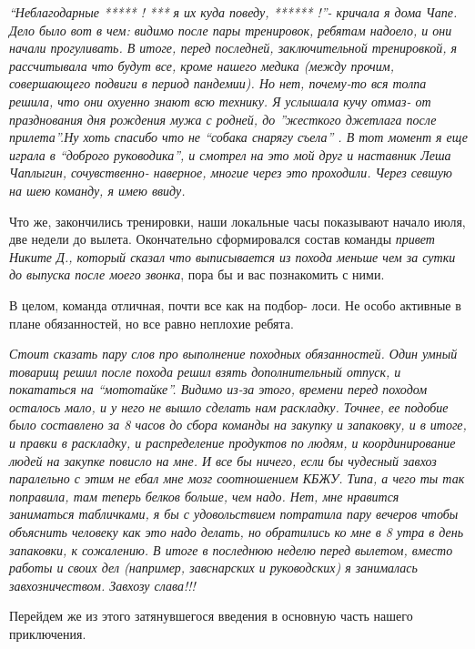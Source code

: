 \documentclass[]{article}
\begin{document}
\textit{“Неблагодарные ***** ! *** я их куда поведу, ****** !”- кричала я дома Чапе. Дело было вот в чем: видимо после пары тренировок, ребятам надоело, и они начали прогуливать. В итоге, перед последней, заключительной тренировкой, я рассчитывала что будут все, кроме нашего медика (между прочим, совершающего подвиги в период пандемии). Но нет, почему-то вся толпа решила, что они охуенно знают всю технику. Я услышала кучу отмаз- от празднования дня рождения мужа с родней, до ”жесткого джетлага после прилета”.Ну хоть спасибо что не “собака снарягу съела” . В тот момент я еще играла в “доброго руководика”, и смотрел на это мой друг и наставник Леша Чаплыгин, сочувственно- наверное, многие через это проходили. Через севшую на шею команду, я имею ввиду.}


Что же, закончились тренировки, наши локальные часы показывают начало июля, две недели до вылета. Окончательно сформировался состав команды \textit{привет Никите Д., который сказал что выписывается из похода меньше чем за сутки до выпуска после моего звонка}, пора бы и вас познакомить с ними. 	

В целом, команда отличная, почти все как на подбор- лоси. Не особо активные в плане обязанностей, но все равно неплохие ребята. 

\textit{Стоит сказать пару слов про выполнение походных обязанностей. Один умный товарищ решил после похода решил взять дополнительный отпуск, и покататься на “мототайке”. Видимо из-за этого, времени перед походом осталось мало, и у него не вышло сделать нам раскладку. Точнее, ее подобие было составлено за 8 часов до сбора команды на закупку и запаковку, и в итоге, и правки в раскладку, и распределение продуктов по людям, и координирование людей на закупке повисло на мне. И все бы ничего, если бы чудесный завхоз паралельно с этим не ебал мне мозг соотношением КБЖУ. Типа, а чего ты так поправила, там теперь белков больше, чем надо. Нет, мне нравится заниматься табличками, я бы с удовольствием потратила пару вечеров чтобы объяснить человеку как это надо делать, но обратились ко мне в 8 утра в день запаковки, к сожалению. В итоге в последнюю неделю перед вылетом, вместо работы и своих дел (например, завснарских и руководских) я занималась завхозничеством. Завхозу слава!!!}


Перейдем же из этого затянувшегося введения в основную часть нашего приключения.

	
\end{document}
